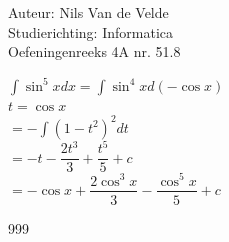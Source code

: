 \documentclass[a4paper]{article}
\begin{document}
  
\noindent \large Auteur: Nils Van de Velde \\
\noindent \large Studierichting: Informatica\\
\noindent \large Oefeningenreeks 4A nr. 51.8\\

\medskip

\normalsize

$\displaystyle\int\sin^5xdx = \displaystyle\int\sin^4xd(-\cos x)$\\

$t = \cos x$\\

$=-\displaystyle\int(1-t^2)^2dt$\\

$=-t-\dfrac{2t^3}{3}+\dfrac{t^5}{5}+c$\\

$=-\cos x+\dfrac{2\cos^3x}{3}-\dfrac{\cos^5x}{5}+c$\\

\begin{thebibliography}{999}
\end{thebibliography}
\end{document}
